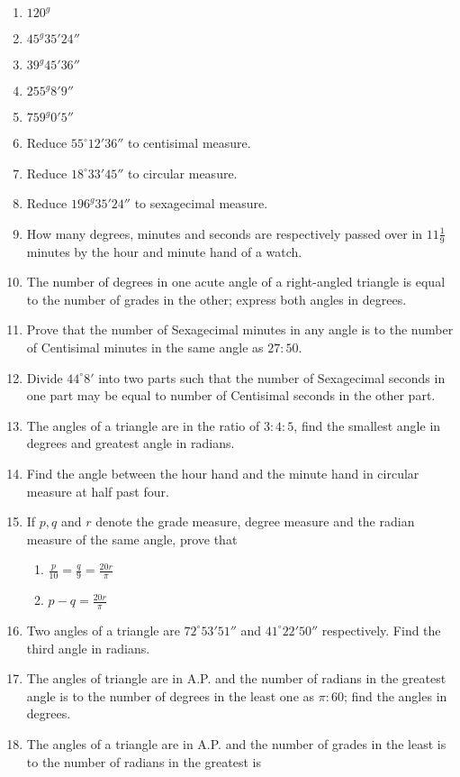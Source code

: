 \begin{enumerate}[resume]
\item $120^g$
\item $45^g35'24''$
\item $39^g45'36''$
\item $255^g8'9''$
\item $759^g0'5''$
\item Reduce $55^{\circ}12'36''$ to centisimal measure.
\item Reduce $18^{\circ}33'45''$ to circular measure.
\item Reduce $196^g35'24''$ to sexagecimal measure.
\item How many degrees, minutes and seconds are respectively passed over in $11\frac{1}{9}$ minutes by the hour and minute hand
    of a watch.
\item The number of degrees in one acute angle of a right-angled triangle is equal to the number of grades in the other; express both
    angles in degrees.
\item Prove that the number of Sexagecimal minutes in any angle is to the number of Centisimal minutes in the same angle as
    $27:50.$
\item Divide $44^{\circ}8'$ into two parts such that the number of Sexagecimal seconds in one part may be equal to number of
    Centisimal seconds in the other part.
\item The angles of a triangle are in the ratio of $3:4:5$, find the smallest angle in degrees and greatest angle in radians.
\item Find the angle between the hour hand and the minute hand in circular measure at half past four.
\item If $p, q$ and $r$ denote the grade measure, degree measure and the radian measure of the same angle, prove that
  \begin{enumerate}
    \item $\frac{p}{10} = \frac{q}{9} = \frac{20r}{\pi}$
    \item $p - q = \frac{20r}{\pi}$
  \end{enumerate}
\item Two angles of a triangle are $72^{\circ}53'51''$ and $41^{\circ}22'50''$ respectively. Find the third angle in
    radians.
\item The angles of triangle are in A.P. and the number of radians in the greatest angle is to the number of degrees in the least one
    as $\pi:60$; find the angles in degrees.
\item The angles of a triangle are in A.P. and the number of grades in the least is to the number of radians in the greatest is

\end{enumerate}
